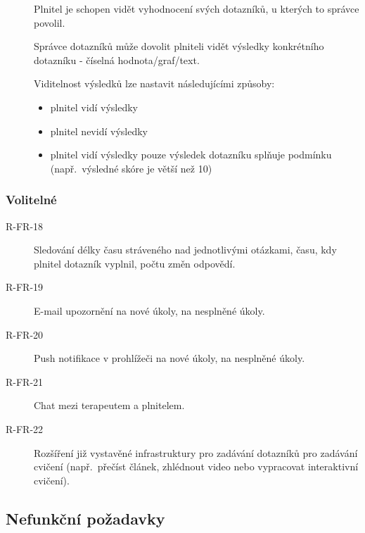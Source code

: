 \begin{description}
    \item[]
    Plnitel je schopen vidět vyhodnocení svých dotazníků, u kterých to správce povolil.
    \item[]
    Správce dotazníků může dovolit plniteli vidět výsledky konkrétního dotazníku - číselná hodnota/graf/text.
    \item[]
    Viditelnost výsledků lze nastavit následujícími způsoby:

    \begin{itemize}
        \item
        plnitel vidí výsledky
        \item
        plnitel nevidí výsledky
        \item
        plnitel vidí výsledky pouze výsledek dotazníku splňuje podmínku (např.\ výsledné skóre je větší než 10)
    \end{itemize}
\end{description}

\subsubsection{Volitelné}

\begin{description}
    \item[R-FR-18]
    Sledování délky času stráveného nad jednotlivými otázkami, času, kdy plnitel dotazník vyplnil, počtu změn odpovědí.
    \item[R-FR-19]
    E-mail upozornění na nové úkoly, na nesplněné úkoly.
    \item[R-FR-20]
    Push notifikace v prohlížeči na nové úkoly, na nesplněné úkoly.
    \item[R-FR-21]
    Chat mezi terapeutem a plnitelem.
    \item[R-FR-22]
    Rozšíření již vystavěné infrastruktury pro zadávání dotazníků pro zadávání cvičení (např.\ přečíst článek, zhlédnout video nebo vypracovat interaktivní cvičení).
\end{description}

\subsection{Nefunkční požadavky}\label{subsec:nefunkcni-pozadavky}

